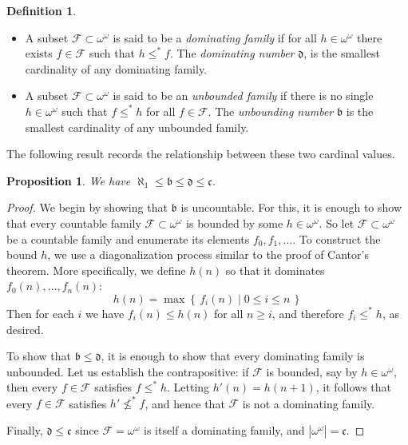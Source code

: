\documentclass[11pt,oneside]{amsbook}
\newcommand{\set}[1]{\left\{\,#1\,\right\}}
\theoremstyle{definition}
\theoremstyle{plain}
\newtheorem{prop}[thm]{Proposition}
\theoremstyle{definition}
\newtheorem{defn}[thm]{Definition}
\theoremstyle{remark}
\begin{document}
\begin{defn}
  \begin{itemize}
  \item A subset $\mathcal F\subset\omega^\omega$ is said to be a \emph{dominating family} if for all $h\in\omega^\omega$ there exists $f\in\mathcal F$ such that $h\leq^*f$. The \emph{dominating number} $\mathfrak d$, is the smallest cardinality of any dominating family.
  \item A subset $\mathcal F\subset\omega^\omega$ is said to be an \emph{unbounded family} if there is no single $h\in\omega^\omega$ such that $f\leq^*h$ for all $f\in\mathcal F$. The \emph{unbounding number} $\mathfrak b$ is the smallest cardinality of any unbounded family.
  \end{itemize}
\end{defn}

The following result records the relationship between these two cardinal values.

\begin{prop}
  \label{prop:bd}
  We have $\aleph_1\leq\mathfrak{b}\leq\mathfrak{d}\leq\mathfrak{c}$.
\end{prop}
	
\begin{proof}
  We begin by showing that $\mathfrak{b}$ is uncountable. For this, it is enough to show that every countable family $\mathcal F\subset\omega^\omega$ is bounded by some $h\in\omega^\omega$. So let $\mathcal F\subset\omega^\omega$ be a countable family and enumerate its elements $f_0,f_1,\ldots$. To construct the bound $h$, we use a diagonalization process similar to the proof of Cantor's theorem. More specifically, we define $h(n)$ so that it dominates $f_0(n),\ldots,f_n(n)$:
\[h(n)=\max\set{f_i(n)\mid 0\leq i\leq n}
\]
Then for each $i$ we have $f_i(n)\leq h(n)$ for all $n\geq i$, and therefore $f_i\leq^*h$, as desired.

To show that $\mathfrak{b}\leq\mathfrak{d}$, it is enough to show that every dominating family is unbounded. Let us establish the contrapositive: if $\mathcal F$ is bounded, say by $h\in\omega^\omega$, then every $f\in\mathcal F$ satisfies $f\leq^*h$. Letting $h'(n)=h(n+1)$, it follows that every $f\in\mathcal F$ satisfies $h'\not\leq^*f$, and hence that $\mathcal F$ is not a dominating family.

Finally, $\mathfrak d\leq\mathfrak c$ since $\mathcal F=\omega^\omega$ is itself a dominating family, and $|\omega^\omega|=\mathfrak c$.
\end{proof}
\end{document}
